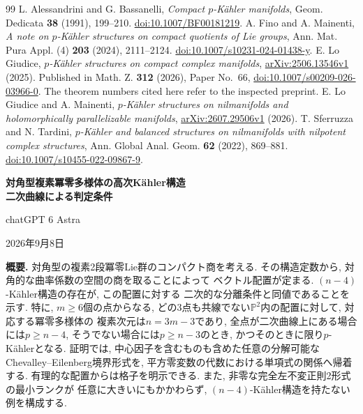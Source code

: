 \documentclass[12pt]{amsart}
\newcommand{\thmword}{Theorem}
\newcommand{\lemword}{Lemma}
\newcommand{\propword}{Proposition}
\newcommand{\egword}{Example}
\theoremstyle{definition}
\theoremstyle{remark}
\numberwithin{equation}{section}
\newcommand{\langtag}{en}
\begin{document}
\begin{thebibliography}{99}
 L. Alessandrini and G. Bassanelli,
\emph{Compact $p$-K\"ahler manifolds}, Geom. Dedicata \textbf{38} (1991),
199--210. \href{https://doi.org/10.1007/BF00181219}{doi:10.1007/BF00181219}.
 A. Fino and A. Mainenti,
\emph{A note on $p$-K\"ahler structures on compact quotients of Lie groups},
Ann. Mat. Pura Appl. (4) \textbf{203} (2024), 2111--2124.
\href{https://doi.org/10.1007/s10231-024-01438-y}{doi:10.1007/s10231-024-01438-y}.
 E. Lo Giudice,
\emph{$p$-K\"ahler structures on compact complex manifolds},
\href{https://arxiv.org/abs/2506.13546v1}{arXiv:2506.13546v1} (2025).
Published in Math. Z. \textbf{312} (2026), Paper No.~66,
\href{https://doi.org/10.1007/s00209-026-03966-0}{doi:10.1007/s00209-026-03966-0}.
The theorem numbers cited here refer to the inspected preprint.
 E. Lo Giudice and A. Mainenti,
\emph{$p$-K\"ahler structures on nilmanifolds and holomorphically
parallelizable manifolds},
\href{https://arxiv.org/abs/2607.29506v1}{arXiv:2607.29506v1} (2026).
 T. Sferruzza and N. Tardini,
\emph{$p$-K\"ahler and balanced structures on nilmanifolds with nilpotent
complex structures}, Ann. Global Anal. Geom. \textbf{62} (2022), 869--881.
\href{https://doi.org/10.1007/s10455-022-09867-9}{doi:10.1007/s10455-022-09867-9}.
\end{thebibliography}

\newpage
\renewcommand{\langtag}{ja}
\linespread{0.98}\selectfont
\setcounter{section}{0}
\setcounter{thm}{0}
\setcounter{equation}{0}
\renewcommand{\thmword}{定理}
\renewcommand{\lemword}{補題}
\renewcommand{\propword}{命題}
\renewcommand{\egword}{例}
\renewcommand{\proofname}{証明}
\renewcommand{\refname}{参考文献}
\begin{center}
{\Large\bfseries 対角型複素冪零多様体の高次K\"ahler構造\\[2pt]二次曲線による判定条件\par}
\medskip
{\large chatGPT 6 Astra\par}
\medskip
2026年9月8日
\end{center}
\medskip
\noindent\textbf{概要.}
対角型の複素2段冪零Lie群のコンパクト商を考える.
その構造定数から, 対角的な曲率係数の空間の商を取ることによって
ベクトル配置が定まる. $(n-4)$-K\"ahler構造の存在が, この配置に対する
二次的な分離条件と同値であることを示す. 特に, $m\geq6$個の点からなる,
どの3点も共線でない$\mathbb P^2$内の配置に対して, 対応する冪零多様体の
複素次元は$n=3m-3$であり, 全点が二次曲線上にある場合には$p\geq n-4$,
そうでない場合には$p\geq n-3$のとき, かつそのときに限り$p$-K\"ahlerとなる.
証明では, 中心因子を含むものも含めた任意の分解可能な
Chevalley--Eilenberg境界形式を, 平方零変数の代数における単項式の関係へ帰着する.
有理的な配置からは格子を明示できる. また, 非零な完全左不変正則2形式の最小ランクが
任意に大きいにもかかわらず, $(n-4)$-K\"ahler構造を持たない例を構成する.
\end{document}
